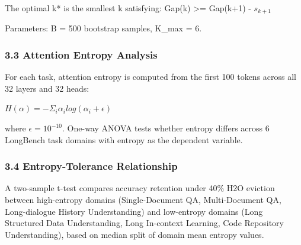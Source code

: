 The optimal k* is the smallest k satisfying: Gap(k) >= Gap(k+1) - $s_{k+1}$

Parameters: B = 500 bootstrap samples, K\_max = 6.

\subsubsection{3.3 Attention Entropy Analysis}

For each task, attention entropy is computed from the first 100 tokens across all 32 layers and 32 heads:

$H(\alpha ) = -\Sigma _i \alpha _i log(\alpha _i + \epsilon )$

where $\epsilon = 10^{-10}$. One-way ANOVA tests whether entropy differs across 6 LongBench task domains with entropy as the dependent variable.

\subsubsection{3.4 Entropy-Tolerance Relationship}

A two-sample t-test compares accuracy retention under 40\% H2O eviction between high-entropy domains (Single-Document QA, Multi-Document QA, Long-dialogue History Understanding) and low-entropy domains (Long Structured Data Understanding, Long In-context Learning, Code Repository Understanding), based on median split of domain mean entropy values.
